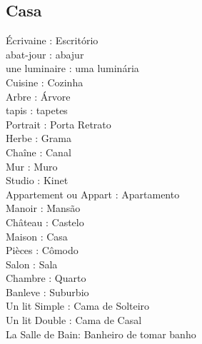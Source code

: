 \documentclass{article}
\begin{document}
    \subsection{Casa}    
                                            Écrivaine    : Escritório\\
                                            abat-jour    : abajur\\
                                une         luminaire    : uma luminária\\
                                            Cuisine      : Cozinha\\
                                            Arbre        : Árvore\\
                                            tapis        : tapetes\\
                                            Portrait     : Porta Retrato\\
                                            Herbe        : Grama\\
                                            Chaîne       : Canal\\
                                            Mur          : Muro\\
                                            Studio       : Kinet\\
                                Appartement ou Appart    : Apartamento\\
                                            Manoir       : Mansão\\
                                            Château      : Castelo\\
                                            Maison       : Casa\\
                                            Pièces       : Cômodo\\
                                            Salon        : Sala\\
                                            Chambre      : Quarto\\
                                            Banleve      : Suburbio\\
                                Un          lit Simple   : Cama de Solteiro\\
                                Un          lit Double   : Cama de Casal\\
                                La          Salle de Bain: Banheiro de tomar banho\\
\end{document}
